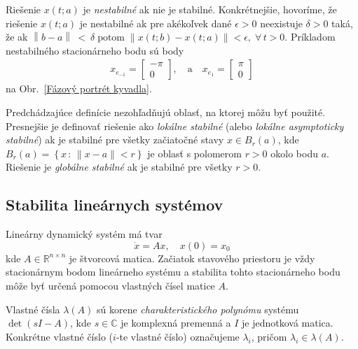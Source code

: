 \documentclass[a4paper, 10pt, ]{article}
\begin{document}
Riešenie $x(t;a)$ je \emph{nestabilné} ak nie je stabilné. Konkrétnejšie, hovoríme, že riešenie $x(t;a)$ je nestabilné ak pre akékoľvek dané $\epsilon > 0$ neexistuje $\delta > 0$ taká, že ak $\left\| b - a \right\|~<~\delta \; \text{potom} \; \left\| x(t;b) - x(t;a) \right\| < \epsilon, \; \forall \, t>0$. Príkladom nestabilného stacionárneho bodu sú body
\begin{align*}
	x_{e_{-1}} =
	\begin{bmatrix}
		-\pi \\ 0
	\end{bmatrix},
	\quad
	\text{a}
	\quad
	x_{e_{1}} =
	\begin{bmatrix}
		\pi \\ 0
	\end{bmatrix}
\end{align*}
na Obr.~\ref{Fázový portrét kyvadla}.

Predchádzajúce definície nezohľadňujú oblasť, na ktorej môžu byť použité. Presnejšie je definovať riešenie ako \emph{lokálne stabilné} (alebo \emph{lokálne asymptoticky stabilné}) ak je stabilné pre všetky začiatočné stavy $x \in B_r(a)$, kde $B_r(a) = \left\{ x \, : \, \| x - a \| < r \right\}$ je oblasť s polomerom $r > 0$ okolo bodu $a$. Riešenie je \emph{globálne stabilné} ak je stabilné pre všetky $r > 0$.











\subsection{Stabilita lineárnych systémov}



Lineárny dynamický systém má tvar
\begin{equation}
	\dot{x} = A x, \quad x(0) = x_0
\end{equation}
kde $A \in \mathbb{R}^{n\times n}$ je štvorcová matica. Začiatok stavového priestoru je vždy stacionárnym bodom lineárneho systému a stabilita tohto stacionárneho bodu môže byť určená pomocou vlastných čísel matice $A$.

Vlastné čísla $\lambda(A)$ sú korene \emph{charakteristického polynómu} systému $\det(sI - A)$, kde $s \in \mathbb{C}$ je komplexná premenná a $I$ je jednotková matica. Konkrétne vlastné číslo ($i$-te vlastné číslo) označujeme $\lambda_i$, pričom $\lambda_i \in \lambda(A)$.
\end{document}
